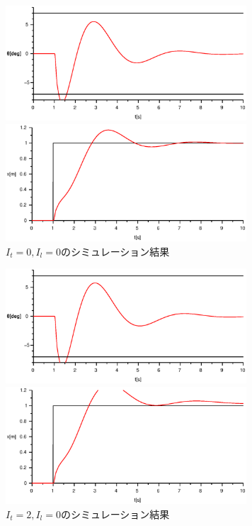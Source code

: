 \documentclass[titlepage]{jsarticle}
\begin{document}
            \begin{figure}[h]
                \begin{minipage}{0.5\hsize}
                    \centering
                    \includegraphics[width=9cm]{img/I0-0t.eps}
                \end{minipage}
                \begin{minipage}{0.5\hsize}
                    \centering
                    \includegraphics[width=9cm]{img/I0-0x.eps}
                \end{minipage}
                \caption{$I_t = 0, I_l = 0$のシミュレーション結果}
                \label{fig:i0-0}
            \end{figure}
            \begin{figure}[h]
                \begin{minipage}{0.5\hsize}
                    \centering
                    \includegraphics[width=9cm]{img/I2-0t.eps}
                \end{minipage}
                \begin{minipage}{0.5\hsize}
                    \centering
                    \includegraphics[width=9cm]{img/I2-0x.eps}
                \end{minipage}
                \caption{$I_t = 2, I_l = 0$のシミュレーション結果}
                \label{fig:i2-0}
            \end{figure}
\end{document}
